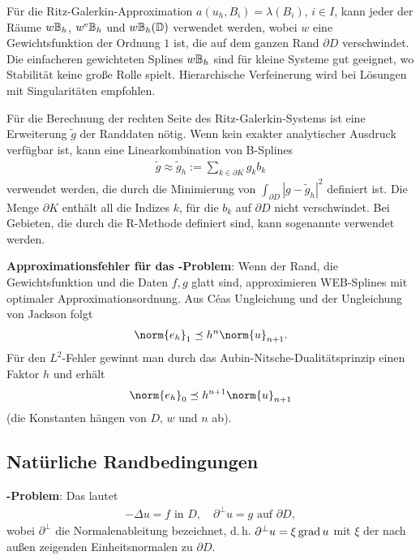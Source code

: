 \linie

Für die Ritz-Galerkin-Approximation $a(u_h, B_i) = \lambda(B_i)$, $i \in I$,
kann jeder der Räume $w\mathbb{B}_h$, $w^{\mathrm{e}}\mathbb{B}_h$ und $w\mathbb{B}_h(\mathbb{D})$ verwendet werden, wobei
$w$ eine Gewichtsfunktion der Ordnung $1$ ist, die auf dem ganzen Rand $\partial D$ verschwindet.
Die einfacheren gewichteten Splines $w\mathbb{B}_h$ sind für kleine Systeme gut geeignet,
wo Stabilität keine große Rolle spielt.
Hierarchische Verfeinerung wird bei Lösungen mit Singularitäten empfohlen.

Für die Berechnung der rechten Seite des Ritz-Galerkin-Systems ist eine Erweiterung $\widetilde{g}$
der Randdaten nötig.
Wenn kein exakter analytischer Ausdruck verfügbar ist, kann eine Linearkombination von B-Splines
\begin{align*}
    \widetilde{g} \approx \widetilde{g}_h := \sum_{k \in \partial K} g_k b_k
\end{align*}
verwendet werden, die durch die Minimierung von $\int_{\partial D} |g - \widetilde{g}_h|^2$
definiert ist.
Die Menge $\partial K$ enthält all die Indizes $k$, für die $b_k$ auf $\partial D$ nicht
verschwindet.
Bei Gebieten, die durch die R-Methode definiert sind, kann sogenannte
 verwendet werden.

\linie
\pagebreak

\textbf{Approximationsfehler für das -Problem}:
Wenn der Rand, die Gewichtsfunktion und die Daten $f, g$ glatt sind,
approximieren WEB-Splines mit optimaler Approximationsordnung.
Aus Céas Ungleichung und der Ungleichung von Jackson folgt
\begin{align*}
    \norm{e_h}_1 \preceq h^n \norm{u}_{n+1}.
\end{align*}
Für den $L^2$-Fehler gewinnt man durch das Aubin-Nitsche-Dualitätsprinzip einen Faktor $h$
und erhält
\begin{align*}
    \norm{e_h}_0 \preceq h^{n+1} \norm{u}_{n+1}
\end{align*}
(die Konstanten hängen von $D$, $w$ und $n$ ab).

\subsection{%
    Natürliche Randbedingungen%
}

\textbf{-Problem}:
Das  lautet
\begin{align*}
    -\Delta u = f \text{ in } D,\quad
    \partial^\perp u = g \text{ auf } \partial D,
\end{align*}
wobei $\partial^\perp$ die Normalenableitung bezeichnet, d.\,h. $\partial^\perp u = \xi \operatorname{grad} u$
mit $\xi$ der nach außen zeigenden Einheitsnormalen zu $\partial D$.

